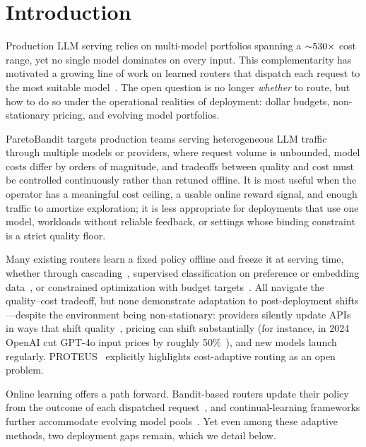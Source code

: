 \section{Introduction}
\label{sec:intro}

Production LLM serving relies on multi-model portfolios spanning a ${\sim}530\times$ cost range, yet no single model dominates on every input. This complementarity has motivated a growing line of work on learned routers that dispatch each request to the most suitable model~\cite{chen2023frugalgpt, ong2024routellm, chen2024routerdc, feng2025graphrouter, mei2025omnirouter, panda2025pilot, bhatti2026proteus}. The open question is no longer \emph{whether} to route, but how to do so under the operational realities of deployment: dollar budgets, non-stationary pricing, and evolving model portfolios.

ParetoBandit targets production teams serving heterogeneous LLM traffic through multiple models or providers, where request volume is unbounded, model costs differ by orders of magnitude, and tradeoffs between quality and cost must be controlled continuously rather than retuned offline. It is most useful when the operator has a meaningful cost ceiling, a usable online reward signal, and enough traffic to amortize exploration; it is less appropriate for deployments that use one model, workloads without reliable feedback, or settings whose binding constraint is a strict quality floor.

Many existing routers learn a fixed policy offline and freeze it at serving time, whether through cascading~\cite{chen2023frugalgpt}, supervised classification on preference or embedding data~\cite{ong2024routellm, chen2024routerdc, feng2025graphrouter}, or constrained optimization with budget targets~\cite{mei2025omnirouter, bhatti2026proteus}. All navigate the quality--cost tradeoff, but none demonstrate adaptation to post-deployment shifts---despite the environment being non-stationary: providers silently update APIs in ways that shift quality~\cite{chen2023chatgptdrift, ma2024prompt}, pricing can shift substantially (for instance, in 2024 OpenAI cut GPT-4o input prices by roughly 50\%~\cite{openai2024gpt4opricing}), and new models launch regularly. PROTEUS~\cite{bhatti2026proteus} explicitly highlights cost-adaptive routing as an open problem.

Online learning offers a path forward. Bandit-based routers update their policy from the outcome of each dispatched request~\cite{panda2025pilot, wang2025barp, li2025llmbandit}, and continual-learning frameworks further accommodate evolving model pools~\cite{wang2025mixllm}. Yet even among these adaptive methods, two deployment gaps remain, which we detail below.

